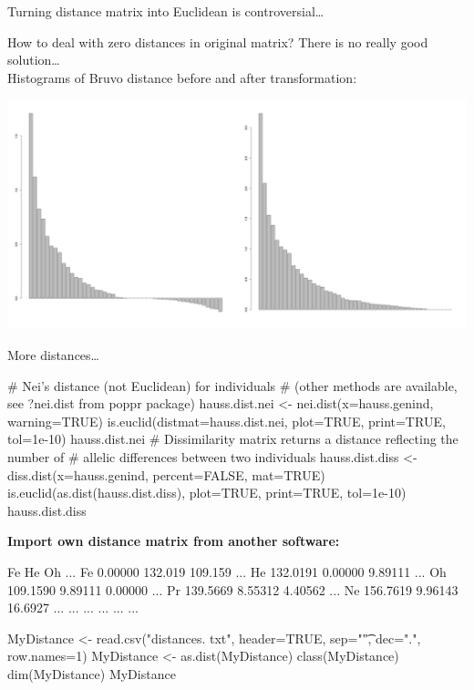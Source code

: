 \documentclass[compress, ucs, xelatex, 11pt, xcolor=svgnames,
  hyperref={
    bookmarks=true,
    unicode=true,
    colorlinks=true,
    pdftitle={Molecular data in R},
    plainpages=false,
    pdfauthor={Vojtech Zeisek},
    pdfsubject={Course about phylogeny and evolution in R},
    pdfcreator={XeLaTeX},
    pdfkeywords={R, evolution, phylogeny, molecular data},
    linkcolor=Tomato,
    anchorcolor=SaddleBrown,
    citecolor=Goldenrod,
    filecolor=DarkMagenta,
    menucolor=Sienna,
    urlcolor=DarkTurquoise,
    pdftex},
  url={hyphens, lowtilde} %
  ]{beamer}
\begin{document}
\begin{frame}{Turning distance matrix into Euclidean is controversial\ldots}
  \begin{footnotesize}
    How to deal with zero distances in original matrix? There is no really good solution\ldots\\ Histograms of Bruvo distance before and after transformation:
  \end{footnotesize}
  \begin{center}
    \includegraphics[width=\textwidth]{bruvodist.png}
  \end{center}
\end{frame}

\begin{frame}[fragile]{More distances\ldots}
  \begin{spluscode}
    # Nei's distance (not Euclidean) for individuals
    # (other methods are available, see ?nei.dist from poppr package)
    hauss.dist.nei <- nei.dist(x=hauss.genind, warning=TRUE)
    is.euclid(distmat=hauss.dist.nei, plot=TRUE, print=TRUE, tol=1e-10)
    hauss.dist.nei
    # Dissimilarity matrix returns a distance reflecting the number of
    # allelic differences between two individuals
    hauss.dist.diss <- diss.dist(x=hauss.genind, percent=FALSE, mat=TRUE)
    is.euclid(as.dist(hauss.dist.diss), plot=TRUE, print=TRUE, tol=1e-10)
    hauss.dist.diss
  \end{spluscode}
\vfill
\textbf{Import own distance matrix from another software:}
\begin{multicols}{2}
  \begin{spluscode}
       Fe       He      Oh      ...
    Fe 0.00000  132.019 109.159 ...
    He 132.0191 0.00000 9.89111 ...
    Oh 109.1590 9.89111 0.00000 ...
    Pr 139.5669 8.55312 4.40562 ...
    Ne 156.7619 9.96143 16.6927 ...
    ... ...     ...     ...     ...
  \end{spluscode}
  \columnbreak
  \begin{spluscode}
    MyDistance <- read.csv("distances.
      txt", header=TRUE, sep="\t",
      dec=".", row.names=1)
    MyDistance <- as.dist(MyDistance)
    class(MyDistance)
    dim(MyDistance)
    MyDistance
  \end{spluscode}
\end{multicols}
\end{frame}
\end{document}
